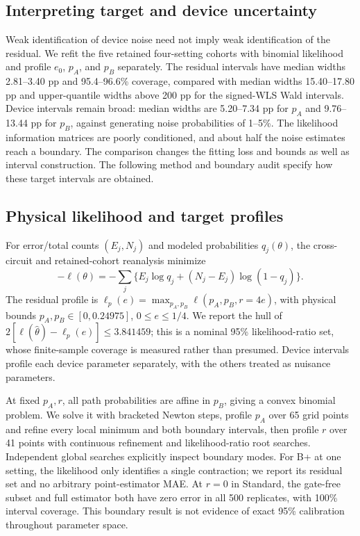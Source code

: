 \subsection{Interpreting target and device uncertainty}
Weak identification of device noise need not imply weak identification of the
residual. We refit the five retained four-setting cohorts with binomial likelihood
and profile $e_0$, $p_A$, and $p_B$ separately. The residual intervals have median
widths 2.81--3.40 pp and 95.4--96.6\% coverage, compared with median widths
15.40--17.80 pp and upper-quantile widths above 200 pp for the signed-WLS Wald
intervals. Device intervals remain broad: median widths are 5.20--7.34 pp for
$p_A$ and 9.76--13.44 pp for $p_B$, against generating noise probabilities of
1--5\%. The likelihood information matrices are poorly conditioned, and about
half the noise estimates reach a boundary.
The comparison changes the fitting loss and bounds as well as interval construction.
The following method and boundary audit specify how these target intervals are obtained.

\subsection{Physical likelihood and target profiles}
\label{app:profiles}
For error/total counts $(E_j,N_j)$ and modeled probabilities $q_j(\theta)$,
the cross-circuit and retained-cohort reanalysis minimize
\begin{equation}
 -\ell(\theta)=-\sum_j\{E_j\log q_j+(N_j-E_j)\log(1-q_j)\}.
\end{equation}
The residual profile is
$\ell_p(e)=\max_{p_A,p_B}\ell(p_A,p_B,r=4e)$, with physical bounds
$p_A,p_B\in[0,0.24975]$, $0\leq e\leq1/4$.
We report the hull of $2[\ell(\widehat\theta)-\ell_p(e)]\leq3.841459$;
this is a nominal 95\% likelihood-ratio set, whose finite-sample coverage is
measured rather than presumed. Device intervals profile each device parameter
separately, with the others treated as nuisance parameters.

At fixed $p_A,r$, all path probabilities are affine in $p_B$, giving a convex
binomial problem. We solve it with bracketed Newton steps, profile $p_A$ over
65 grid points and refine every local minimum and both boundary intervals, then
profile $r$ over 41 points with continuous refinement and likelihood-ratio root
searches. Independent global searches explicitly inspect boundary modes.
For B+ at one setting, the likelihood only identifies a single contraction;
we report its residual set and no arbitrary point-estimator MAE. At $r=0$ in
Standard, the gate-free subset and full estimator both have zero error in all
500 replicates, with 100\% interval coverage. This boundary result is not evidence
of exact 95\% calibration throughout parameter space.

